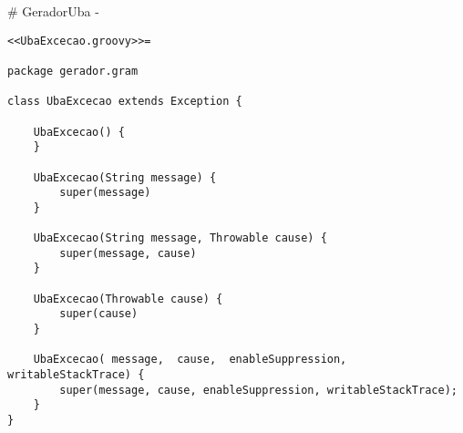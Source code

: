 # GeradorUba {-}

\begin{lstlisting}
<<UbaExcecao.groovy>>=

package gerador.gram

class UbaExcecao extends Exception {

    UbaExcecao() {
    }

    UbaExcecao(String message) {
        super(message)
    }

    UbaExcecao(String message, Throwable cause) {
        super(message, cause)
    }

    UbaExcecao(Throwable cause) {
        super(cause)
    }

    UbaExcecao( message,  cause,  enableSuppression,  writableStackTrace) {
        super(message, cause, enableSuppression, writableStackTrace);
    }
}

\end{lstlisting}
